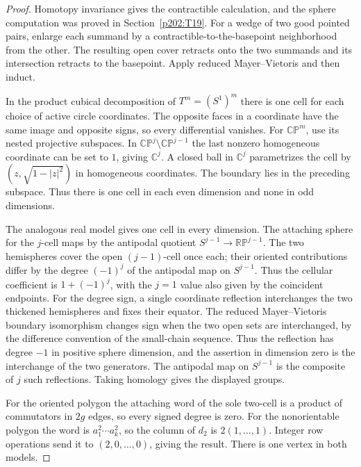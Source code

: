 \documentclass[11pt,oneside,openany]{book}
\theoremstyle{plain}
\theoremstyle{definition}
\theoremstyle{remark}
\begin{document}
\begin{proof}
Homotopy invariance gives the contractible calculation, and the
sphere computation was proved in Section~\ref{p202:T19}. For a
wedge of two good pointed pairs, enlarge each summand by a
contractible-to-the-basepoint neighborhood from the other.
The resulting open cover retracts onto the two summands and
its intersection retracts to the basepoint. Apply reduced
Mayer--Vietoris and then induct.

In the product cubical decomposition of \(T^m=(S^1)^m\)
there is one cell for each choice of active circle coordinates.
The opposite faces in a coordinate have the same image and
opposite signs, so every differential vanishes. For
\(\mathbb{CP}^m\), use its nested projective subspaces. In
\(\mathbb{CP}^j\setminus\mathbb{CP}^{j-1}\) the last nonzero
homogeneous coordinate can be set to \(1\), giving \(\mathbb C^j\).
A closed ball in \(\mathbb C^j\) parametrizes the cell by
\((z,\sqrt{1-\lvert z\rvert^2})\) in homogeneous coordinates.
The boundary lies in the preceding subspace. Thus there is
one cell in each even dimension and none in odd dimensions.

The analogous real model gives one cell in every dimension.
The attaching sphere for the \(j\)-cell maps by the antipodal
quotient \(S^{j-1}\to\mathbb{RP}^{j-1}\). The two hemispheres
cover the open \((j-1)\)-cell once each; their oriented
contributions differ by the degree \((-1)^j\) of the antipodal
map on \(S^{j-1}\). Thus the cellular coefficient is
\(1+(-1)^j\), with the \(j=1\) value also given by the coincident
endpoints. For the degree sign, a single coordinate
reflection interchanges the two thickened hemispheres and
fixes their equator. The reduced Mayer--Vietoris boundary
isomorphism changes sign when the two open sets are
interchanged, by the difference convention of the small-chain
sequence. Thus the reflection has degree \(-1\) in positive
sphere dimension, and the assertion in dimension zero is
the interchange of the two generators. The antipodal map
on \(S^{j-1}\) is the composite of \(j\) such reflections.
Taking homology gives the displayed groups.

For the oriented polygon the attaching word of the sole
two-cell is a product of commutators in \(2g\) edges, so every
signed degree is zero. For the nonorientable polygon the word
is \(a_1^2\cdots a_k^2\), so the column of \(d_2\) is
\(2(1,\ldots,1)\). Integer row operations send it to
\((2,0,\ldots,0)\), giving the result. There is one vertex
in both models.
\end{proof}
\end{document}
